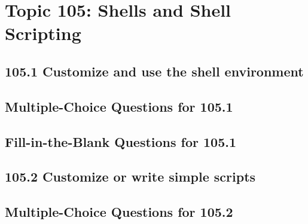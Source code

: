 \documentclass[a4paper]{report}
\begin{document}
\newpage
\chapter{Topic 105: Shells and Shell Scripting}

\newpage
\section*{105.1 Customize and use the shell environment}

\newpage
\section*{Multiple-Choice Questions for 105.1}

\newpage
\section*{Fill-in-the-Blank Questions for 105.1}

\newpage
\section*{105.2 Customize or write simple scripts}

\newpage
\section*{Multiple-Choice Questions for 105.2}
\end{document}
